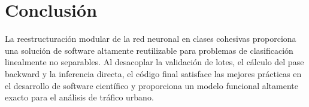 \documentclass[11pt,a4paper]{article}
\begin{document}
\section*{Conclusión}
La reestructuración modular de la red neuronal en clases cohesivas proporciona una solución de software altamente reutilizable para problemas de clasificación linealmente no separables. Al desacoplar la validación de lotes, el cálculo del pase backward y la inferencia directa, el código final satisface las mejores prácticas en el desarrollo de software científico y proporciona un modelo funcional altamente exacto para el análisis de tráfico urbano.
\end{document}
